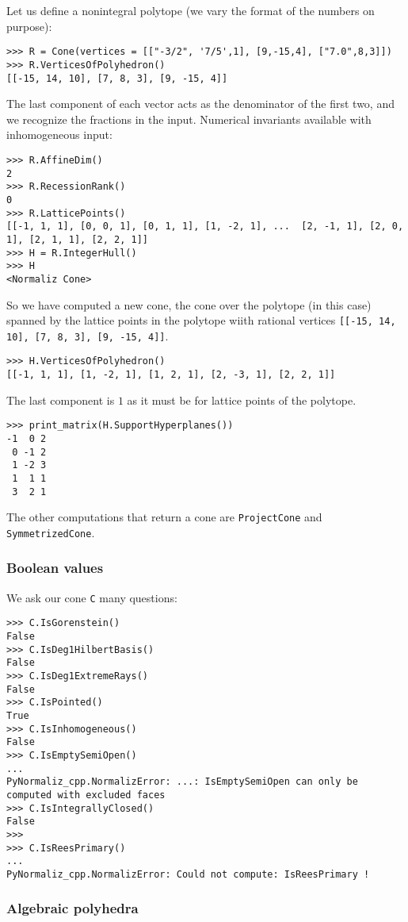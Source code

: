\documentclass[12pt,a4paper]{scrartcl}
\theoremstyle{definition}
\begin{document}
\begin{small}
Let us define a nonintegral polytope (we vary the format of the numbers on purpose):
\begin{Verbatim}
>>> R = Cone(vertices = [["-3/2", '7/5',1], [9,-15,4], ["7.0",8,3]])
>>> R.VerticesOfPolyhedron()
[[-15, 14, 10], [7, 8, 3], [9, -15, 4]]
\end{Verbatim}
The last component of each vector acts as the denominator of the first two, and we recognize the fractions in the input. Numerical invariants available with inhomogeneous input:
\begin{Verbatim}
>>> R.AffineDim()
2
>>> R.RecessionRank()
0
>>> R.LatticePoints()
[[-1, 1, 1], [0, 0, 1], [0, 1, 1], [1, -2, 1], ...  [2, -1, 1], [2, 0, 1], [2, 1, 1], [2, 2, 1]]
>>> H = R.IntegerHull()
>>> H
<Normaliz Cone>
\end{Verbatim}
So we have computed a new cone, the cone over the polytope (in this case) spanned by the lattice points in the polytope wiith rational vertices \verb|[[-15, 14, 10], [7, 8, 3], [9, -15, 4]]|.
\begin{Verbatim}
>>> H.VerticesOfPolyhedron()
[[-1, 1, 1], [1, -2, 1], [1, 2, 1], [2, -3, 1], [2, 2, 1]]
\end{Verbatim}
The last component is $1$ as it must be for lattice points of the polytope.
\begin{Verbatim}
>>> print_matrix(H.SupportHyperplanes())
-1  0 2
 0 -1 2
 1 -2 3
 1  1 1
 3  2 1
\end{Verbatim}

The other computations that return a cone are \verb|ProjectCone| and \verb|SymmetrizedCone|.

\subsubsection{Boolean values}

We ask our cone \verb|C| many questions:
\begin{Verbatim}
>>> C.IsGorenstein()
False
>>> C.IsDeg1HilbertBasis()
False
>>> C.IsDeg1ExtremeRays()
False
>>> C.IsPointed()
True
>>> C.IsInhomogeneous()
False
>>> C.IsEmptySemiOpen()
...
PyNormaliz_cpp.NormalizError: ...: IsEmptySemiOpen can only be computed with excluded faces
>>> C.IsIntegrallyClosed()
False
>>> 
>>> C.IsReesPrimary()
...
PyNormaliz_cpp.NormalizError: Could not compute: IsReesPrimary !
\end{Verbatim}


\subsubsection{Algebraic polyhedra}


\end{small}
\end{document}
